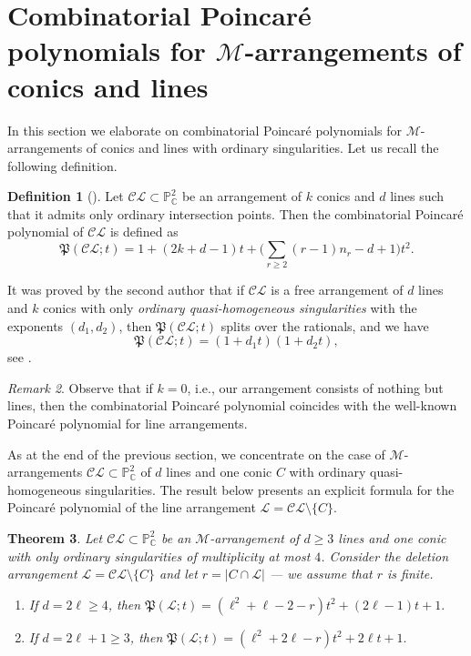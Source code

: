 \documentclass[11pt]{article}
\theoremstyle{plain}
\newtheorem{theorem}{Theorem}[section]
\theoremstyle{definition}
\newtheorem{definition}[theorem]{Definition}
\theoremstyle{remark}
\newtheorem{remark}[theorem]{Remark}
\begin{document}
\section[Combinatorial Poincar\'e polynomials for M-arrangements of conics and lines]{Combinatorial Poincar\'e polynomials for $\mathscr{M}$-arrangements of conics and lines}
In this section we elaborate on combinatorial Poincar\'e polynomials for $\mathscr{M}$-arrangements of conics and lines with ordinary singularities. Let us recall the following definition.
\begin{definition}[{\cite[Definition 1.4]{Pok}}]
Let $\mathcal{CL} \subset \mathbb{P}^{2}_{\mathbb{C}}$ be an arrangement of $k$ conics and $d$ lines such that it admits only ordinary intersection points. Then the combinatorial Poincar\'e polynomial of $\mathcal{CL}$ is defined as
$$\mathfrak{P}(\mathcal{CL};t) = 1+(2k+d-1)t + \bigg(\sum_{r\geq 2}(r-1)n_{r}-d+1 \bigg)t^{2}.$$
\end{definition}
It was proved by the second author that if $\mathcal{CL}$ is a free arrangement of $d$ lines and $k$ conics with only \textit{ordinary quasi-homogeneous singularities} with the exponents $(d_{1},d_{2})$, then $\mathfrak{P}(\mathcal{CL};t)$ splits over the rationals, and we have 
\begin{equation}
    \mathfrak{P}(\mathcal{CL};t) = (1+d_{1}t)(1+d_{2}t),
\end{equation}
see \cite[Theorem 1.5]{Pok}.
\begin{remark}
Observe that if $k=0$, i.e., our arrangement consists of nothing but lines, then the combinatorial Poincar\'e polynomial coincides with the well-known Poincar\'e polynomial for line arrangements.
\end{remark}
As at the end of the previous section, we concentrate on the case of $\mathscr{M}$-arrangements $\mathcal{CL}\subset \mathbb{P}^{2}_{\mathbb{C}}$ of $d$ lines and one conic $C$ with ordinary quasi-homogeneous singularities. The result below presents an explicit formula for the Poincar\'e polynomial of the line arrangement $\mathcal{L} = \mathcal{CL} \setminus \{C\}$.
\begin{theorem}
\label{poil}
Let $\mathcal{CL}\subset \mathbb{P}^{2}_{\mathbb{C}}$ be an $\mathscr{M}$-arrangement of $d\geq 3$ lines and one conic with only ordinary singularities of multiplicity at most $4$. Consider the deletion arrangement $\mathcal{L} = \mathcal{CL}\setminus \{C\}$ and let $r = |C \cap \mathcal{L}|$ --- we assume that $r$ is finite.
\begin{enumerate}
    \item If $d=2\ell\geq 4$, then $\mathfrak{P}(\mathcal{L};t) = (\ell^{2}+\ell-2-r)t^{2}+(2\ell-1)t+1.$
    \item If $d=2\ell+1\geq 3$, then $\mathfrak{P}(\mathcal{L};t) = (\ell^{2}+2\ell-r)t^{2}+2\ell t+1.$
\end{enumerate}
\end{theorem}
\end{document}
